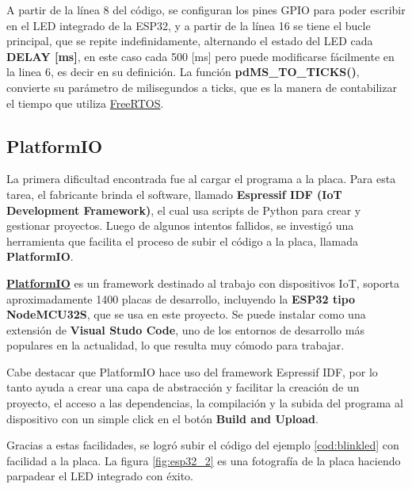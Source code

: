 A partir de la línea 8 del código, se configuran los pines GPIO para poder escribir en el LED integrado de la ESP32, y a partir de la línea 16 se tiene el bucle principal, que se repite indefinidamente, alternando el estado del LED cada \textbf{DELAY [ms]}, en este caso cada 500 [ms] pero puede modificarse fácilmente en la linea 6, es decir en su definición. La función \textbf{pdMS\_TO\_TICKS()}, convierte su parámetro de milisegundos a ticks, que es la manera de contabilizar el tiempo que utiliza \href{https://www.freertos.org/}{FreeRTOS}.

\subsection{PlatformIO}
La primera dificultad encontrada fue al cargar el programa a la placa. Para esta tarea, el fabricante brinda el software, llamado \textbf{Espressif IDF (IoT Development Framework)}, el cual usa scripts de Python para crear y gestionar proyectos. Luego de algunos intentos fallidos, se investigó una herramienta que facilita el proceso de subir el código a la placa, llamada \textbf{PlatformIO}.

\textbf{\href{https://platformio.org/}{PlatformIO}} es un framework destinado al trabajo con dispositivos IoT, soporta aproximadamente 1400 placas de desarrollo, incluyendo la \textbf{ESP32 tipo NodeMCU32S}, que se usa en este proyecto. Se puede instalar como una extensión de \textbf{Visual Studo Code}, uno de los entornos de desarrollo más populares en la actualidad, lo que resulta muy cómodo para trabajar.

Cabe destacar que PlatformIO hace uso del framework Espressif IDF, por lo tanto ayuda a crear una capa de abstracción y facilitar la creación de un proyecto, el acceso a las dependencias, la compilación y la subida del programa al dispositivo con un simple click en el botón \textbf{Build and Upload}.

Gracias a estas facilidades, se logró subir el código del ejemplo \ref{cod:blinkled} con facilidad a la placa. La figura \ref{fig:esp32_2} es una fotografía de la placa haciendo parpadear el LED integrado con éxito.


